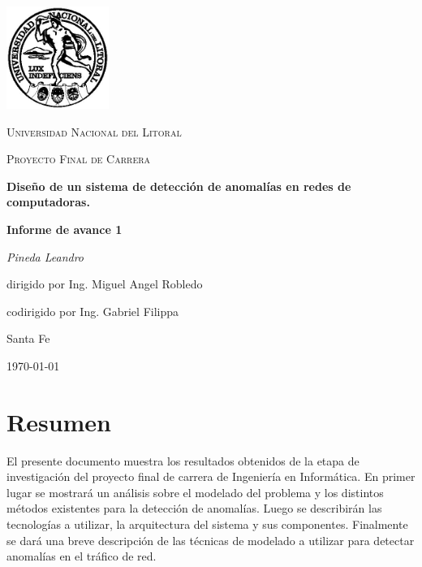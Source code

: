 \documentclass[a4paper,10pt, oneside]{book}
\begin{document}
\begin{titlepage}
	\centering
	\includegraphics[width=0.25\textwidth]{../../Universidad_del_Litoral}\par\vspace{1cm}
	{\scshape\LARGE Universidad Nacional del Litoral \par}
	\vspace{1cm}
	{\scshape\Large Proyecto Final de Carrera\par}
	\vspace{1.5cm}
	{\huge\bfseries Diseño de un sistema de detección de anomalías en redes de computadoras.\par}
	\vspace{1.5cm}
	{\huge\bfseries Informe de avance 1\par}
	\vspace{2cm}
	{\Large\itshape Pineda Leandro\par}
	\vfill
	dirigido por Ing. Miguel Angel Robledo\par
	codirigido por Ing. Gabriel Filippa
	
	\vfill
	
	\large Santa Fe\par
	{\large \today\par}
	
\end{titlepage}

\modulolinenumbers[5]

\newpage

\section*{Resumen}
El presente documento muestra los resultados obtenidos de la etapa de investigación del proyecto final de carrera de Ingeniería en Informática. En primer lugar se mostrará un análisis sobre el modelado del problema y los distintos métodos existentes para la detección de anomalías. Luego se describirán las tecnologías a utilizar, la arquitectura del sistema y sus componentes. Finalmente se dará una breve descripción de las técnicas de modelado a utilizar para detectar anomalías en el tráfico de red.
\end{document}
